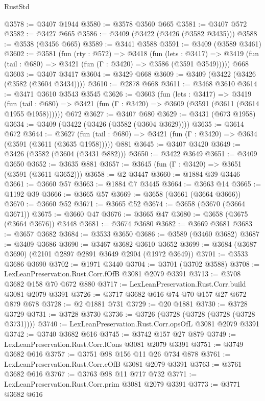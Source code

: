 \begin{lexlean}{RustStd}
\begin{coremodule}
@3578 := @3407 @1944
@3580 := @3578 @3560 @665
@3581 := @3407 @572
@3582 := @3427 @665
@3586 := @3409 (@3422 (@3426 (@3582 @3435)))
@3588 := @3538 (@3456 @665)
@3589 := @3441 @3588
@3591 := @3409 (@3589 @3461)
@3602 := @3581
    (fun (rty : @572) =>
    @3418
      (fun (lets : @3417) =>
      @3419 (fun (tail : @680) => @3421 (fun (Γ : @3420) => @3586 (@3591 @3549)))))
    @668
@3603 := @3407 @3417
@3604 := @3429 @668
@3609 := @3409 (@3422 (@3426 (@3582 (@3604 @3434))))
@3610 := @2878 @668
@3611 := @3468 @3610
@3614 := @3471 @3610 @3543 @3545
@3626 := @3603
    (fun (lets : @3417) =>
    @3419
      (fun (tail : @680) => @3421 (fun (Γ : @3420) => @3609 (@3591 (@3611 (@3614 @1955 @1958))))))
    @672
@3627 := @3407 @680
@3629 := @3431 (@673 @1958)
@3634 := @3409 (@3422 (@3426 (@3582 (@3604 @3629))))
@3635 := @3614 @672
@3644 := @3627
    (fun (tail : @680) => @3421 (fun (Γ : @3420) => @3634 (@3591 (@3611 (@3635 @1958)))))
    @881
@3645 := @3407 @3420
@3649 := @3426 (@3582 (@3604 (@3431 @882)))
@3650 := @3422 @3649
@3651 := @3409 @3650
@3652 := @3635 @881
@3657 := @3645 (fun (Γ : @3420) => @3651 (@3591 (@3611 @3652)))
@3658 := @2 @3447
@3660 := @1884 @39 @3446
@3661 := @3660 @57
@3663 := @1884 @7 @3445
@3664 := @3663 @14
@3665 := @1192 @39
@3666 := @3665 @57
@3669 := @3658 (@3661 (@3664 @3666))
@3670 := @3660 @52
@3671 := @3665 @52
@3674 := @3658 (@3670 (@3664 @3671))
@3675 := @3660 @47
@3676 := @3665 @47
@3680 := @3658 (@3675 (@3664 @3676)) @3448
@3681 := @3674 @3680
@3682 := @3669 @3681
@3683 := @3657 @3682
@3684 := @3533 @3650
@3686 := @3589 (@3460 @3682)
@3687 := @3409 @3686
@3690 := @3467 @3682 @3610 @3652
@3699 := @3684 (@3687 @3690) (@2101 @2897 @2891 @3649 @2904 (@1972 @3649))
@3701 := @3533 @3686 @3690
@3702 := @1971 @3440
@3704 := @3701 (@3702 @3588)
@3708 := LexLeanPreservation.Rust.Corr.fOfB @3081 @2079 @3391
@3713 := @3708 @3682 @158 @70 @672 @880
@3717 := LexLeanPreservation.Rust.Corr.build @3081 @2079 @3391
@3726 := @3717 @3682 @616 @74 @70 @157 @27 @672 @879 @678
@3728 := @2 @1881 @731
@3729 := @20 @1881
@3730 := @3728 @3729
@3731 := @3728 @3730
@3736 := @3726 (@3728 (@3728 (@3728 (@3728 @3731))))
@3740 := LexLeanPreservation.Rust.Corr.opsOfL @3081 @2079 @3391
@3742 := @3740 @3682 @616
@3745 := @3742 @157 @27 @879
@3749 := LexLeanPreservation.Rust.Corr.lCons @3081 @2079 @3391
@3751 := @3749 @3682 @616
@3757 := @3751 @98 @156 @11 @26 @734 @878
@3761 := LexLeanPreservation.Rust.Corr.eOfB @3081 @2079 @3391
@3763 := @3761 @3682 @616
@3767 := @3763 @98 @11 @717 @732
@3771 := LexLeanPreservation.Rust.Corr.prim @3081 @2079 @3391
@3773 := @3771 @3682 @616

\end{coremodule}
\end{lexlean}
